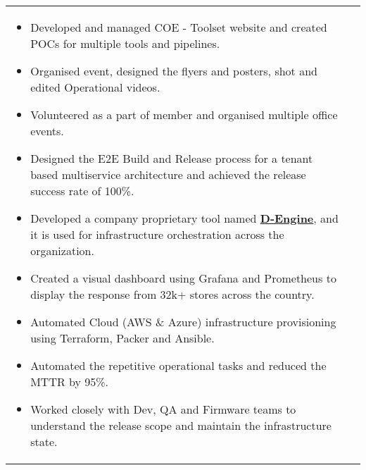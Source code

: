 \documentclass[11pt, a4paper]{article}
\begin{document}
\begin{tabular}{L{1.7cm}!{\color{gray}\vrule}l}
\begin{minipage}[t]{0.86\textwidth}
\begin{itemize}[leftmargin=*]
    \item Developed and managed COE - Toolset website and created POCs for multiple tools and pipelines.
    \item Organised  event, designed the flyers and posters, shot and edited Operational videos.
    \item Volunteered as a part of  member and organised multiple office events.
    \item Designed the E2E Build and Release process for a tenant based multiservice architecture and achieved the release success rate of 100\%.
	\item Developed a company proprietary tool named \href{https://www.youtube.com/watch?v=YWLU2OU13tA}{\bf D-Engine}, and it is used for infrastructure orchestration across the organization.
	\item Created a visual dashboard using Grafana and Prometheus to display the response from 32k+ stores across the country.
	\item Automated Cloud (AWS \& Azure) infrastructure provisioning using Terraform, Packer and Ansible.
	\item Automated the repetitive operational tasks and reduced the MTTR by 95\%.
	\item Worked closely with Dev, QA and Firmware teams to understand the release scope and maintain the infrastructure state.
    \end{itemize}
  \end{minipage}
\end{tabular} 

\vspace{4mm}

\pagebreak
\end{document}
